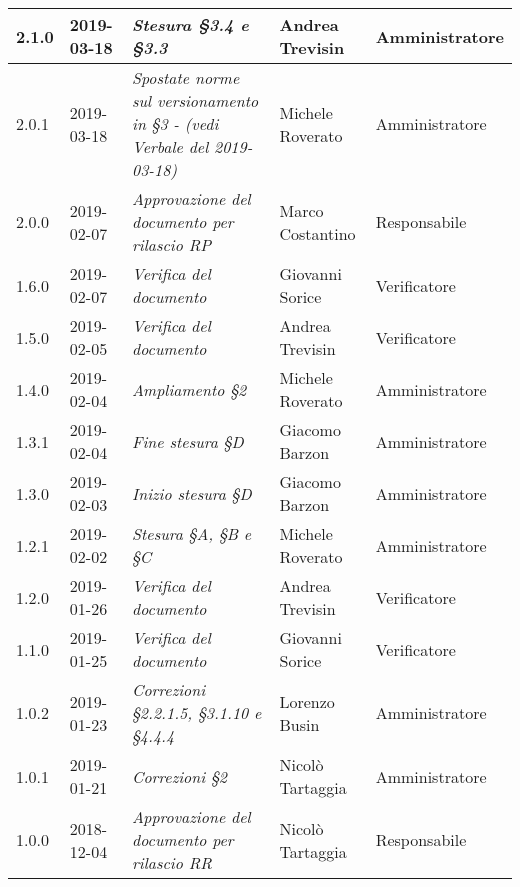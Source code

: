 \begin{longtable}{C{2cm}|C{2.5cm}|C{4.5cm}|C{2.5cm}|C{3cm}}
		2.1.0 & 2019-03-18 & \emph{Stesura §3.4 e §3.3} & Andrea Trevisin & Amministratore \\
		\hline
		
		2.0.1 & 2019-03-18 & \emph{Spostate norme sul versionamento in §3 - (vedi Verbale del 2019-03-18)} & Michele Roverato & Amministratore \\
		\hline
		
		2.0.0 & 2019-02-07 & \emph{Approvazione del documento per rilascio RP} & Marco Costantino & Responsabile \\
		\hline
		
		1.6.0 & 2019-02-07 & \emph{Verifica del documento}  & Giovanni Sorice & Verificatore  \\
		\hline
		
		1.5.0 & 2019-02-05 & \emph{Verifica del documento} & Andrea Trevisin & Verificatore  \\
		\hline
		
		1.4.0 & 2019-02-04 & \emph{Ampliamento §2} & Michele Roverato & Amministratore  \\
		\hline
		
		 1.3.1 & 2019-02-04 & \emph{Fine stesura §D} & Giacomo Barzon & Amministratore \\
		\hline
		
		1.3.0 & 2019-02-03 & \emph{Inizio stesura §D} & Giacomo Barzon & Amministratore  \\
		\hline
		
		1.2.1 & 2019-02-02 & \emph{Stesura §A, §B e §C} & Michele Roverato & Amministratore  \\
		\hline
		
		1.2.0 & 2019-01-26 & \emph{Verifica del documento} & Andrea Trevisin & Verificatore  \\
		\hline
		
		1.1.0 & 2019-01-25 & \emph{Verifica del documento} & Giovanni Sorice & Verificatore  \\
		\hline
		
		1.0.2 & 2019-01-23 & \emph{Correzioni §2.2.1.5, §3.1.10 e §4.4.4} & Lorenzo Busin & Amministratore \\
		\hline
		
		1.0.1 & 2019-01-21 & \emph{Correzioni §2} & Nicolò Tartaggia & Amministratore  \\
		\hline
		
		1.0.0  & 2018-12-04 & \emph{Approvazione del documento per rilascio RR} & Nicolò Tartaggia & Responsabile \\
		\hline
		

\end{longtable}
